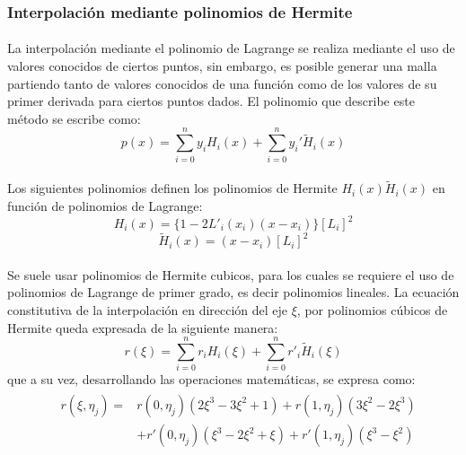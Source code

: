 \documentclass[letterpaper, openright, 12pt]{book}
\begin{document}
    \subsubsection{Interpolación mediante polinomios de Hermite}
    \paragraph*{}
        La interpolación mediante el polinomio de Lagrange se realiza mediante
        el uso de valores conocidos de ciertos puntos, sin embargo, es posible
        generar una malla partiendo tanto de valores conocidos de una función
        como de los valores de su primer derivada para ciertos puntos dados.
        El polinomio que describe este método se escribe como:
        \begin{equation}
        p(x) = \sum_{i = 0}^{n} y_{i}H_{i}(x) + \sum_{i = 0}^{n}y_{i}\prime \widetilde{H}_{i}(x)
        \end{equation}

    \paragraph*{}
        Los siguientes polinomios definen los polinomios de Hermite $H_{i}(x) \widetilde{H}_{i}(x)$
        en función de polinomios de Lagrange:
        \begin{equation}
            H_{i}(x) = \{  1 - 2L\prime_{i}(x_{i})(x - x_{i})  \} \left[L_{i}\right]^2
        \end{equation}
        \begin{equation}
            \widetilde{H}_{i}(x) = (x - x_{i}) \left[L_{i}\right] ^ 2
        \end{equation}
    \paragraph*{}
        Se suele usar polinomios de Hermite cubicos, para los cuales se requiere
        el uso de polinomios de Lagrange de primer grado, es decir polinomios
        lineales. La ecuación constitutiva de la interpolación en dirección del
        eje $\xi$, por polinomios cúbicos de Hermite queda expresada de la
        siguiente manera:
        \begin{equation}
            r(\xi) = \sum_{i = 0}^{n} r_{i}H_{i}(\xi) + \sum_{i = 0}^{n} r\prime_{i}\widetilde{H}_{i}(\xi)
        \end{equation}
        que a su vez, desarrollando las operaciones matemáticas, se expresa como:
        \begin{align}
            &\begin{aligned}
                r(\xi, \eta_{j}) =& r(0, \eta_{j})(2\xi^3 - 3\xi^2 +1) + r(1, \eta_{j})(3\xi^2 - 2\xi^3) \\ &+ r\prime(0, \eta_{j})(\xi^3 - 2\xi^2 + \xi) + r\prime(1, \eta_{j})(\xi^3 - \xi^2)
            \end{aligned}
        \end{align}
\end{document}
